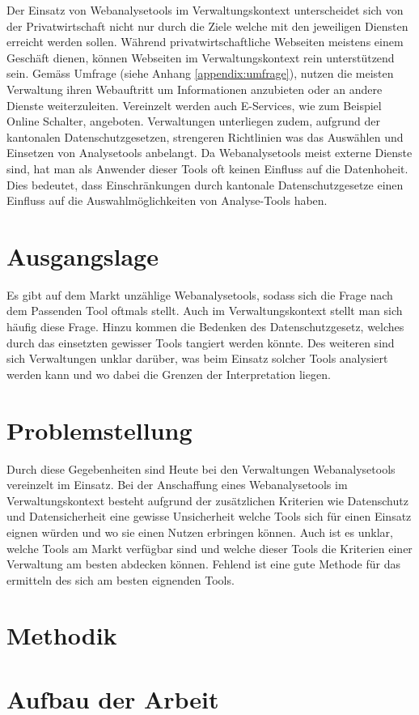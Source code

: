 
Der Einsatz von Webanalysetools im Verwaltungskontext unterscheidet sich von der Privatwirtschaft nicht nur durch die Ziele welche mit den jeweiligen Diensten erreicht werden sollen. Während privatwirtschaftliche Webseiten meistens einem Geschäft dienen, können Webseiten im Verwaltungskontext rein unterstützend sein. Gemäss Umfrage (siehe Anhang \ref{appendix:umfrage}), nutzen die meisten Verwaltung ihren Webauftritt um Informationen anzubieten oder an andere Dienste weiterzuleiten. Vereinzelt werden auch E-Services, wie zum Beispiel Online Schalter, angeboten. Verwaltungen unterliegen zudem, aufgrund der kantonalen Datenschutzgesetzen, strengeren Richtlinien was das Auswählen und Einsetzen von Analysetools anbelangt. Da Webanalysetools meist externe Dienste sind, hat man als Anwender dieser Tools oft keinen Einfluss auf die Datenhoheit. Dies bedeutet, dass Einschränkungen durch kantonale Datenschutzgesetze einen Einfluss auf die Auswahlmöglichkeiten von Analyse-Tools haben.


\section{Ausgangslage}
Es gibt auf dem Markt unzählige Webanalysetools, sodass sich die Frage nach dem Passenden Tool oftmals stellt. Auch im Verwaltungskontext stellt man sich häufig diese Frage. Hinzu kommen die Bedenken des Datenschutzgesetz, welches durch das einsetzten gewisser Tools tangiert werden könnte. Des weiteren sind sich Verwaltungen unklar darüber, was beim Einsatz solcher Tools analysiert werden kann und wo dabei die Grenzen der Interpretation liegen.

\section{Problemstellung}

Durch diese Gegebenheiten sind Heute bei den Verwaltungen Webanalysetools vereinzelt im Einsatz. Bei der Anschaffung eines Webanalysetools im Verwaltungskontext besteht aufgrund der zusätzlichen Kriterien wie Datenschutz und Datensicherheit eine gewisse Unsicherheit welche Tools sich für einen Einsatz eignen würden und wo sie einen Nutzen erbringen können. Auch ist es unklar, welche Tools am Markt verfügbar sind und welche dieser Tools die Kriterien einer Verwaltung am besten abdecken können. Fehlend ist eine gute Methode für das ermitteln des sich am besten eignenden Tools.

\section{Methodik}


\section{Aufbau der Arbeit}

